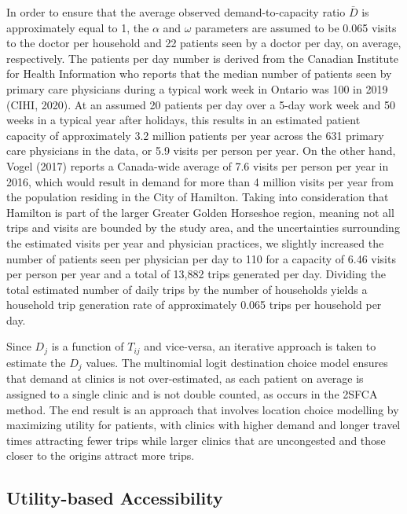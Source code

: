 \documentclass[]{elsarticle} %
\begin{document}
In order to ensure that the average observed demand-to-capacity ratio
\(\bar{D}\) is approximately equal to 1, the \(\alpha\) and \(\omega\)
parameters are assumed to be 0.065 visits to the doctor per household
and 22 patients seen by a doctor per day, on average, respectively. The
patients per day number is derived from the Canadian Institute for
Health Information who reports that the median number of patients seen
by primary care physicians during a typical work week in Ontario was 100
in 2019 (CIHI, 2020). At an assumed 20 patients per day over a 5-day
work week and 50 weeks in a typical year after holidays, this results in
an estimated patient capacity of approximately 3.2 million patients per
year across the 631 primary care physicians in the data, or 5.9 visits
per person per year. On the other hand, Vogel (2017) reports a
Canada-wide average of 7.6 visits per person per year in 2016, which
would result in demand for more than 4 million visits per year from the
population residing in the City of Hamilton. Taking into consideration
that Hamilton is part of the larger Greater Golden Horseshoe region,
meaning not all trips and visits are bounded by the study area, and the
uncertainties surrounding the estimated visits per year and physician
practices, we slightly increased the number of patients seen per
physician per day to 110 for a capacity of 6.46 visits per person per
year and a total of 13,882 trips generated per day. Dividing the total
estimated number of daily trips by the number of households yields a
household trip generation rate of approximately 0.065 trips per
household per day.

Since \(D_j\) is a function of \(T_{ij}\) and vice-versa, an iterative
approach is taken to estimate the \(D_j\) values. The multinomial logit
destination choice model ensures that demand at clinics is not
over-estimated, as each patient on average is assigned to a single
clinic and is not double counted, as occurs in the 2SFCA method. The end
result is an approach that involves location choice modelling by
maximizing utility for patients, with clinics with higher demand and
longer travel times attracting fewer trips while larger clinics that are
uncongested and those closer to the origins attract more trips.

\hypertarget{utility-based-accessibility}{%
\subsection{Utility-based
Accessibility}\label{utility-based-accessibility}}
\end{document}
